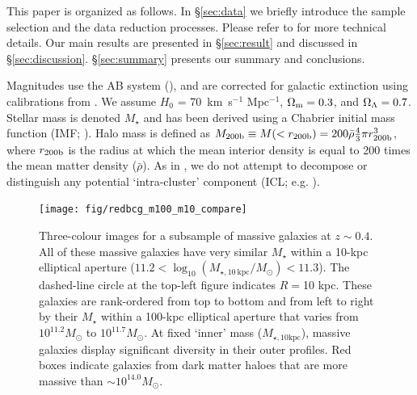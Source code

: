 \documentclass[a4paper,fleqn,usenatbib]{mnras}
\def\mstar{{$M_{\star}$}}
\def\minn{{$M_{\star,10\mathrm{kpc}}$}}
\begin{document}
    This paper is organized as follows. 
    In \S \ref{sec:data} we briefly introduce the sample selection and the data 
    reduction processes.  
    Please refer to \citet{hscMassiveI} for more technical details.
    Our main results are presented in \S \ref{sec:result} and discussed in 
    \S \ref{sec:discussion}. 
    \S \ref{sec:summary} presents our summary and conclusions.

    Magnitudes use the AB system (\citealt{Oke1983}), and are corrected for galactic 
    extinction using calibrations from \citet{Schlafly11}. 
    We assume $H_0$ = 70~km~s$^{-1}$ Mpc$^{-1}$, ${\Omega}_{\rm m}=0.3$, 
    and ${\Omega}_{\rm \Lambda}=0.7$.
    Stellar mass is denoted \mstar{} and has been derived using a Chabrier initial mass 
    function (IMF; \citealt{Chabrier2003}). Halo mass is defined as 
    $M_{\rm 200b}\equiv M(<r_{\rm 200b})=200\bar{\rho} 
    \frac{4}{3}\pi r_{\rm 200b}^3$, where $r_{\rm 200b}$
    is the radius at which the mean interior density is equal to 200 times
    the mean matter density ($\bar{\rho}$). 
    As in \citet{hscMassiveI}, we do not attempt to decompose or distinguish any  
    potential `intra-cluster' 
    component (ICL; e.g. \citealt{Carlberg1997, Lin2004, Gonzalez2005, Mihos2005}). 
    

  \begin{figure}
      \centering 
      \texttt{[image: fig/redbcg\_m100\_m10\_compare]}
      \caption{
          Three-colour images for a subsample of massive galaxies at $z{\sim}0.4$. 
          All of these massive galaxies have very similar \mstar{} within a 10-kpc 
          elliptical aperture 
          ($11.2<\log_{10} (M_{\star,10\ \mathrm{kpc}}/M_{\odot})<11.3$). 
          The dashed-line circle at the top-left figure indicates $R=$10 kpc.
          These galaxies are rank-ordered from top to bottom and from left to right 
          by their \mstar{} within a 100-kpc elliptical aperture that varies 
          from $10^{11.2} M_{\odot}$ to $10^{11.7} M_{\odot}$. 
          At fixed `inner' mass (\minn{}), massive galaxies display significant
          diversity in their outer profiles. 
          Red boxes indicate galaxies from dark matter haloes that are more massive 
          than ${\sim} 10^{14.0} M_{\odot}$. 
          }
      \label{fig:m100_m10_color}
  \end{figure}
\end{document}
